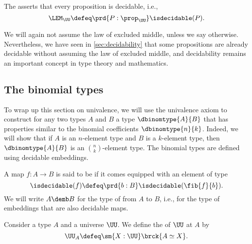 \begin{defn}
  The  asserts that every proposition is decidable, i.e.,
  \begin{equation*}
    \LEM_\UU\defeq \prd{P:\prop_\UU}\isdecidable(P).
  \end{equation*}
\end{defn}

We will again not assume the law of excluded middle, unless we say otherwise. Nevertheless, we have seen in \cref{sec:decidability} that some propositions are already decidable without assuming the law of excluded middle, and decidability remains an important concept in type theory and mathematics.

\subsection{The binomial types}

To wrap up this section on univalence, we will use the univalence axiom to construct for any two types $A$ and $B$ a type $\dbinomtype{A}{B}$ that has properties similar to the binomial coefficients $\dbinomtype{n}{k}$. Indeed, we will show that if $A$ is an $n$-element type and $B$ is a $k$-element type, then $\dbinomtype{A}{B}$ is an $\binom{n}{k}$-element type. The binomial types are defined using decidable embeddings.

\begin{defn}
  A map $f:A\to B$ is said to be  if it comes equipped with an element of type
  \begin{equation*}
    \isdecidable(f) \defeq \prd{b:B}\isdecidable(\fib{f}{b}).
  \end{equation*}
  We will write $A\demb B$ for the type of  from $A$ to $B$, i.e., for the type of embeddings that are also decidable maps. 
\end{defn}

\begin{defn}
  Consider a type $A$ and a universe $\UU$. We define the  of $\UU$ at $A$ by
  \begin{equation*}
    \UU_A\defeq \sm{X:\UU}\brck{A\simeq X}.
  \end{equation*}
\end{defn}

